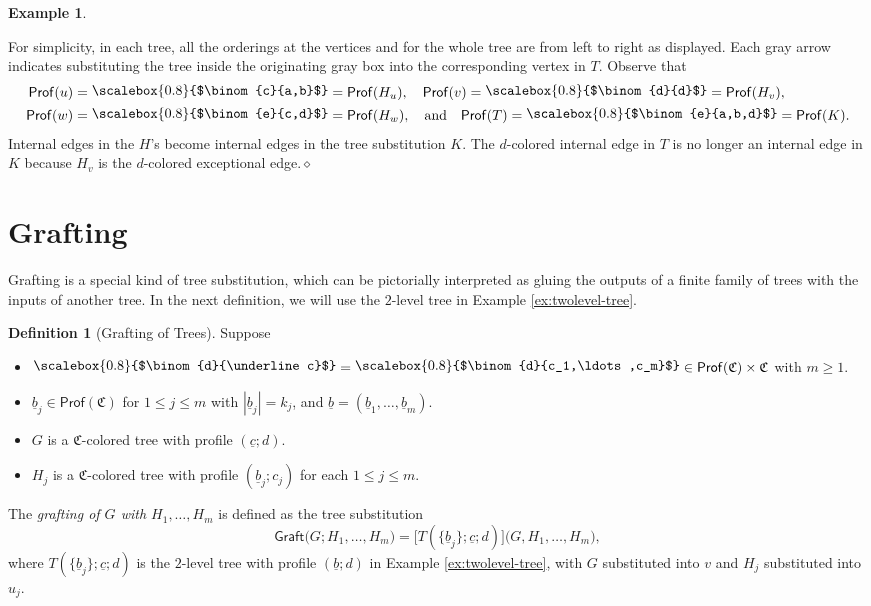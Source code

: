 \documentclass{amsbook}
\numberwithin{section}{chapter}
\numberwithin{subsection}{section}
\numberwithin{equation}{section}
\theoremstyle{plain}
\theoremstyle{definition}
\newtheorem{definition}[equation]{Definition}
\newtheorem{example}[equation]{Example}
\newcommand{\colorc}{\mathfrak{C}}
\newcommand{\graft}{\mathsf{Graft}}
\newcommand{\Prof}{\mathsf{Prof}}
\newcommand{\Profc}{\Prof(\colorc)}
\newcommand{\Profcc}{\Profc \times \colorc}
\newcommand{\profofhv}{\Prof(H_v)}
\newcommand{\profofk}{\Prof(K)}
\newcommand{\profoft}{\Prof(T)}
\newcommand{\profofu}{\Prof(u)}
\newcommand{\profofv}{\Prof(v)}
\newcommand{\profofw}{\Prof(w)}
\newcommand{\dqed}{\hfill$\diamond$}
\newcommand{\ub}{\underline b}
\newcommand{\uc}{\underline c}
\newcommand{\smallprof}[1]
{\raisebox{.05cm}{\scalebox{0.8}{#1}}}
\newcommand{\sbinom}[2]{\raisebox{.05cm}{\scalebox{0.8}{$\binom{#1}{#2}$}}}
\newcommand{\duc}{\smallprof{$\binom{d}{\uc}$}}
\newcommand{\dconecm}{\smallprof{$\binom{d}{c_1,\ldots,c_m}$}}
\newcommand{\dd}{\smallprof{$\binom{d}{d}$}}
\newcommand{\andspace}{\quad\text{and}\quad}
\begin{document}
\begin{example}
\begin{center}
\end{center}
For simplicity, in each tree, all the orderings at the vertices and for the whole tree are from left to right as displayed.  Each gray arrow indicates substituting the tree inside the originating gray box into the corresponding vertex in $T$.  Observe that 
\[\begin{split}\profofu&=\sbinom{c}{a,b}=\Prof(H_u),\quad \profofv=\dd=\profofhv,\\
\profofw&=\sbinom{e}{c,d}=\Prof(H_w),\andspace \profoft=\sbinom{e}{a,b,d}=\profofk.\end{split}\]
Internal edges in the $H$'s become internal edges in the tree substitution $K$.  The $d$-colored internal edge in $T$ is no longer an internal edge in $K$ because $H_v$ is the $d$-colored exceptional edge.\dqed
\end{example}

\section{Grafting}\label{sec:grafting}

Grafting is a special kind of tree substitution, which can be pictorially interpreted as gluing the outputs of a finite family of trees with the inputs of another tree.  In the next definition, we will use the $2$-level tree in Example \ref{ex:twolevel-tree}.

\begin{definition}[Grafting of Trees]\label{def:grafting}
Suppose 
\begin{itemize}\item $\duc=\dconecm \in \Profcc$ with $m\geq 1$.
\item $\ub_j \in \Profc$ for $1 \leq j \leq m$ with $|\ub_j|=k_j$, and $\ub=(\ub_1,\ldots,\ub_m)$. 
\item $G$ is a $\colorc$-colored tree with profile $(\uc;d)$.
\item $H_j$ is a $\colorc$-colored tree with profile $(\ub_j;c_j)$ for each $1 \leq j \leq m$.  
\end{itemize}
The \emph{grafting of $G$ with $H_1,\ldots,H_m$} is defined as the tree substitution\label{notation:grafting}
\[\graft\bigl(G;H_1,\ldots,H_m\bigr) = \bigl[T\left(\{\ub_j\};\uc;d\right)\bigr]\bigl(G,H_1,\ldots,H_m\bigr),\]
where $T\left(\{\ub_j\};\uc;d\right)$ is the $2$-level tree with profile $(\ub;d)$ in Example \ref{ex:twolevel-tree}, with $G$ substituted into $v$ and $H_j$ substituted into $u_j$.
\end{definition}
\end{document}

